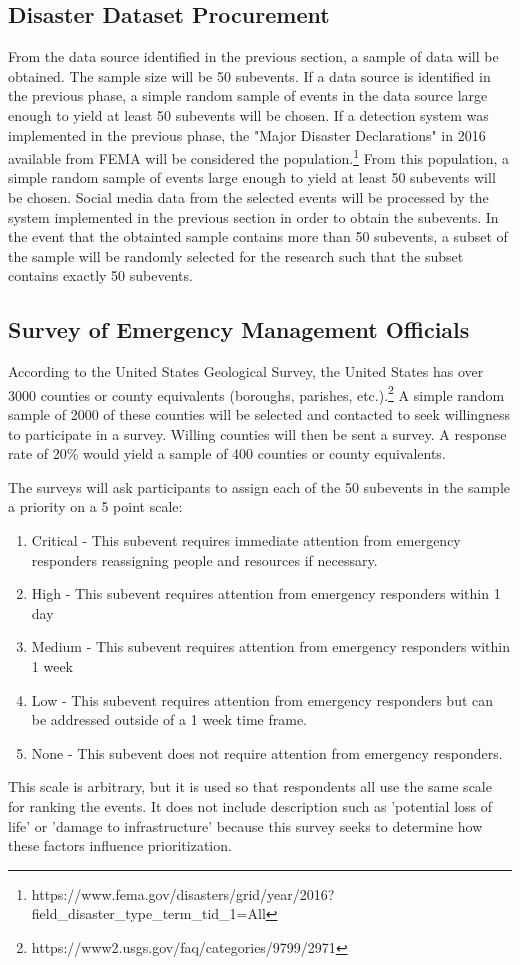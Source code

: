 \documentclass[conference]{IEEEtran}
\begin{document}
\subsection{Disaster Dataset Procurement}
From the data source identified in the previous section, a sample of data will be obtained. The sample size will be 50 subevents. If a data source is identified in the previous phase, a simple random sample of events in the data source large enough to yield at least 50 subevents will be chosen. If a detection system was implemented in the previous phase, the "Major Disaster Declarations" in 2016 available from FEMA will be considered the population.\footnote{https://www.fema.gov/disasters/grid/year/2016?field\_disaster\_type\_term\_tid\_1=All} From this population, a simple random sample of events large enough to yield at least 50 subevents will be chosen. Social media data from the selected events will be processed by the system implemented in the previous section in order to obtain the subevents. In the event that the obtainted sample contains more than 50 subevents, a subset of the sample will be randomly selected for the research such that the subset contains exactly 50 subevents.
\subsection{Survey of Emergency Management Officials}
According to the United States Geological Survey, the United States has over 3000 counties or county equivalents (boroughs, parishes, etc.).\footnote{https://www2.usgs.gov/faq/categories/9799/2971} A simple random sample of 2000 of these counties will be selected and contacted to seek willingness to participate in a survey. Willing counties will then be sent a survey. A response rate of 20\% would yield a sample of 400 counties or county equivalents.

The surveys will ask participants to assign each of the 50 subevents in the sample a priority on a 5 point scale:
\begin{enumerate}
	\item Critical - This subevent requires immediate attention from emergency responders reassigning people and resources if necessary.
	\item High - This subevent requires attention from emergency responders within 1 day
	\item Medium - This subevent requires attention from emergency responders within 1 week
	\item Low - This subevent requires attention from emergency responders but can be addressed outside of a 1 week time frame.
	\item None - This subevent does not require attention from emergency responders.
\end{enumerate}
This scale is arbitrary, but it is used so that respondents all use the same scale for ranking the events. It does not include description such as 'potential loss of life' or 'damage to infrastructure' because this survey seeks to determine how these factors influence prioritization.
\end{document}
